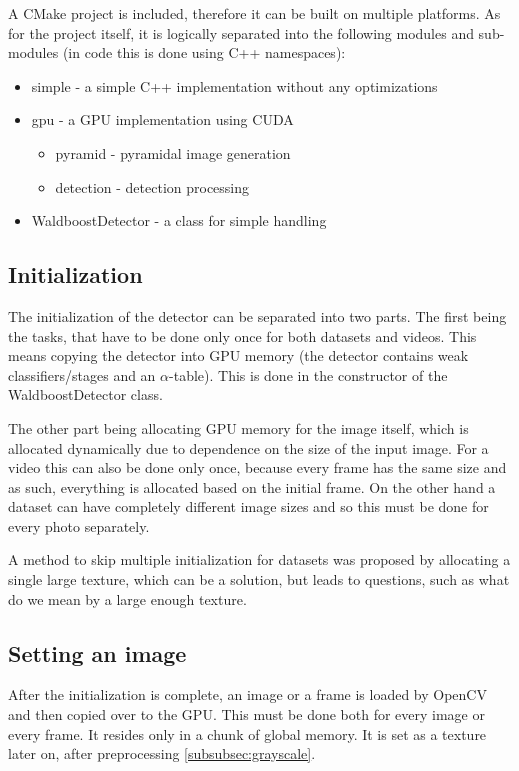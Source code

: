 A CMake project is included, therefore it can be built on multiple platforms. As for the project itself, it is logically separated into the following modules and sub-modules (in code this is done using C++ namespaces):

\begin{itemize}
	\item simple - a simple C++ implementation without any optimizations
	\item gpu - a GPU implementation using CUDA
	\begin{itemize}
		\item pyramid - pyramidal image generation
		\item detection - detection processing
	\end{itemize}
	\item WaldboostDetector - a class for simple handling
\end{itemize}

\subsection{Initialization}\label{subsec:init}

The initialization of the detector can be separated into two parts. The first being the tasks, that have to be done only once for both datasets and videos. This means copying the detector into GPU memory (the detector contains weak classifiers/stages and an $\alpha$-table). This is done in the constructor of the WaldboostDetector class.

The other part being allocating GPU memory for the image itself, which is allocated dynamically due to dependence on the size of the input image. For a video this can also be done only once, because every frame has the same size and as such, everything is allocated based on the initial frame. On the other hand a dataset can have completely different image sizes and so this must be done for every photo separately.

A method to skip multiple initialization for datasets was proposed by allocating a single large texture, which can be a solution, but leads to questions, such as what do we mean by a large enough texture.

\subsection{Setting an image}

After the initialization is complete, an image or a frame is loaded by OpenCV and then copied over to the GPU. This must be done both for every image or every frame. It resides only in a chunk of global memory. It is set as a texture later on, after preprocessing \ref{subsubsec:grayscale}.

